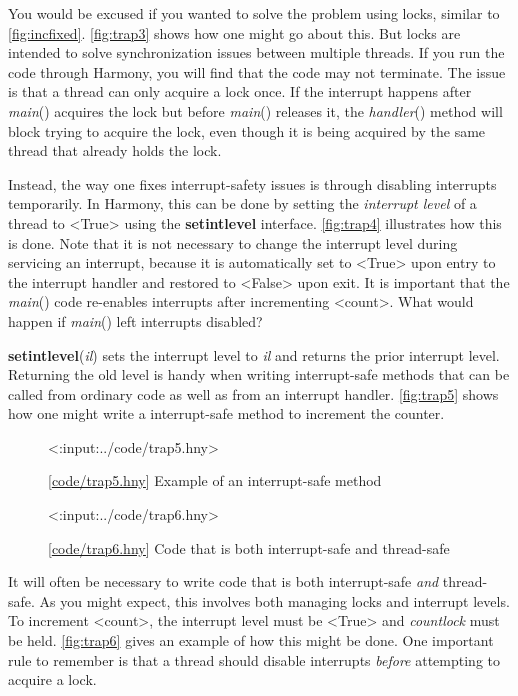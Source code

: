 \documentclass{report}
\newcommand{\harmonylink}[1]{%
[\href{https://harmony.cs.cornell.edu/#1}{\underline{#1}}]%
}
\newenvironment{code}{
\tcolorbox
}{
\endtcolorbox
}
\begin{document}
{You would be excused if you wanted to solve the problem using locks, similar to
\autoref{fig:incfixed}.  \autoref{fig:trap3} shows how one might go about this.
But locks are intended to solve synchronization issues between multiple threads.
If you run the code through Harmony, you will find that the code may not terminate.
The issue is that a thread can only acquire a lock once.  If the interrupt happens
after \textit{main}() acquires the lock but before \textit{main}() releases it, the
\textit{handler}() method will block trying to acquire the lock, even though
it is being acquired by the same thread that already holds the lock.

Instead, the way one fixes interrupt-safety issues is through disabling interrupts
temporarily.  In Harmony, this can be done by setting the \textit{interrupt level}
of a thread to <{True}> using the \textbf{setintlevel} interface.
\autoref{fig:trap4} illustrates how this is done.
Note that it is not necessary to change the interrupt level during servicing an
interrupt, because it is automatically set to <{True}> upon entry to the interrupt
handler and restored to <{False}> upon exit.
It is important that the \textit{main}() code re-enables interrupts after incrementing
<{count}>.  What would happen if \textit{main}() left interrupts disabled?

\textbf{setintlevel}(\textit{il}) sets the interrupt level to \textit{il} and returns
the prior interrupt level.  Returning the old level is handy when writing interrupt-safe
methods that can be called from ordinary code as well as from an interrupt handler.
\autoref{fig:trap5} shows how one might write a interrupt-safe method
to increment the counter.

\begin{figure}
\begin{code}
<{:input:../code/trap5.hny}>
\end{code}
\caption{\harmonylink{code/trap5.hny} Example of an interrupt-safe method}
\label{fig:trap5}
\end{figure}

\begin{figure}
\begin{code}
<{:input:../code/trap6.hny}>
\end{code}
\caption{\harmonylink{code/trap6.hny} Code that is both interrupt-safe and thread-safe}
\label{fig:trap6}
\end{figure}

It will often be necessary to write code that is both interrupt-safe \emph{and}
thread-safe.  As you might expect, this involves both managing locks and
interrupt levels.
To increment <{count}>, the interrupt level must be <{True}> and
\textit{countlock} must be held.
\autoref{fig:trap6} gives an example of how this might be done.
One important rule to remember is that a thread should disable interrupts \emph{before}
attempting to acquire a lock.

}
\end{document}
